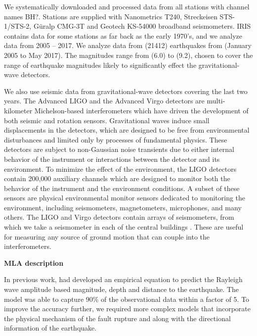 \documentclass[preprint, aps, showpacs]{revtex4-1}
\newcommand{\rednote}[1]{{\color{red} (#1)}}
\begin{document}
We systematically downloaded and processed data from all stations with channel names BH?. Stations are supplied with Nanometrics T240, Streckeisen STS-1/STS-2, G\"uralp CMG-3T and Geotech KS-54000 broadband seismometers. 
IRIS contains data for some stations as far back as the early 1970's, and we analyze data from 2005 -- 2017.
We analyze data from \rednote{21412} earthquakes from \rednote{January 2005 to May 2017}.
The magnitudes range from \rednote{6.0} to \rednote{9.2}, chosen to cover the range of earthquake magnitudes likely to significantly effect the gravitational-wave detectors.

We also use seismic data from gravitational-wave detectors covering the last two years.
The Advanced LIGO \cite{aligo} and the Advanced Virgo \cite{avirgo}  detectors are multi-kilometer Michelson-based interferometers which have driven the development of both seismic \cite{BeCa2016} and rotation \cite{VeHa2014} sensors.
Gravitational waves induce small displacements in the detectors, which are designed to be free from environmental disturbances and limited only by processes of fundamental physics.
These detectors are subject to non-Gaussian noise transients due to either internal behavior of the instrument or interactions between the detector and its environment. To minimize the effect of the environment, the LIGO detectors contain 200,000 auxiliary channels which are designed to monitor both the behavior of the instrument and the environment conditions.
A subset of these sensors are physical environmental monitor sensors dedicated to monitoring the environment, including seismometers, magnetometers, microphones, and many others.
The LIGO and Virgo detectors contain arrays of seismometers, from which we take a seismometer in each of the central buildings \cite{AbEA2016f}. These are useful for measuring any source of ground motion that can couple into the interferometers.

\textbf{MLA description}

In previous work, \cite{CoEa2017} had developed an empirical equation to predict the Rayleigh wave amplitude based magnitude, depth and distance to the earthquake. The model was able to capture 90\% of the observational data within a factor of 5. To improve the accuracy further, we required more complex models that incorporate the physical mechanism of the fault rupture and along with the directional information of the earthquake. 
\end{document}
